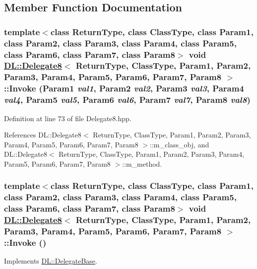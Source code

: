 \subsection{Member Function Documentation}
\hypertarget{classDL_1_1Delegate8_a3}{
\subsubsection[Invoke]{\setlength{\rightskip}{0pt plus 5cm}template$<$class Return\-Type, class Class\-Type, class Param1, class Param2, class Param3, class Param4, class Param5, class Param6, class Param7, class Param8$>$ void \hyperlink{classDL_1_1Delegate8}{DL::Delegate8}$<$ Return\-Type, Class\-Type, Param1, Param2, Param3, Param4, Param5, Param6, Param7, Param8 $>$::Invoke (Param1 {\em val1}, Param2 {\em val2}, Param3 {\em val3}, Param4 {\em val4}, Param5 {\em val5}, Param6 {\em val6}, Param7 {\em val7}, Param8 {\em val8})}}
\label{classDL_1_1Delegate8_a3}




Definition at line 73 of file Delegate8.hpp.

References DL::Delegate8$<$ Return\-Type, Class\-Type, Param1, Param2, Param3, Param4, Param5, Param6, Param7, Param8 $>$::m\_\-class\_\-obj, and DL::Delegate8$<$ Return\-Type, Class\-Type, Param1, Param2, Param3, Param4, Param5, Param6, Param7, Param8 $>$::m\_\-method.\hypertarget{classDL_1_1Delegate8_a2}{
\subsubsection[Invoke]{\setlength{\rightskip}{0pt plus 5cm}template$<$class Return\-Type, class Class\-Type, class Param1, class Param2, class Param3, class Param4, class Param5, class Param6, class Param7, class Param8$>$ void \hyperlink{classDL_1_1Delegate8}{DL::Delegate8}$<$ Return\-Type, Class\-Type, Param1, Param2, Param3, Param4, Param5, Param6, Param7, Param8 $>$::Invoke ()}}
\label{classDL_1_1Delegate8_a2}




Implements \hyperlink{classDL_1_1DelegateBase_a2}{DL::Delegate\-Base}.

